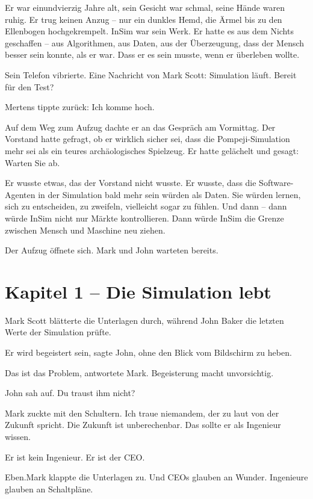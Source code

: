 \documentclass[
]{article}
\begin{document}
Er war einundvierzig Jahre alt, sein Gesicht war schmal, seine Hände waren ruhig. Er trug keinen Anzug -- nur ein dunkles Hemd, die Ärmel bis zu den Ellenbogen hochgekrempelt. InSim war sein Werk. Er hatte es aus dem Nichts geschaffen -- aus Algorithmen, aus Daten, aus der Überzeugung, dass der Mensch besser sein konnte, als er war. Dass er es sein musste, wenn er überleben wollte.

Sein Telefon vibrierte. Eine Nachricht von Mark Scott: \glqq Simulation läuft. Bereit für den Test?\grqq

Mertens tippte zurück: \glqq Ich komme hoch.\grqq

Auf dem Weg zum Aufzug dachte er an das Gespräch am Vormittag. Der Vorstand hatte gefragt, ob er wirklich sicher sei, dass die Pompeji-Simulation mehr sei als ein teures archäologisches Spielzeug. Er hatte gelächelt und gesagt: \glqq Warten Sie ab.\grqq

Er wusste etwas, das der Vorstand nicht wusste. Er wusste, dass die Software-Agenten in der Simulation bald mehr sein würden als Daten. Sie würden lernen, sich zu entscheiden, zu zweifeln, vielleicht sogar zu fühlen. Und dann -- dann würde InSim nicht nur Märkte kontrollieren. Dann würde InSim die Grenze zwischen Mensch und Maschine neu ziehen.

Der Aufzug öffnete sich. Mark und John warteten bereits.

\newpage

\section{Kapitel 1 -- Die Simulation lebt}

Mark Scott blätterte die Unterlagen durch, während John Baker die letzten Werte der Simulation prüfte.

\glqq Er wird begeistert sein\grqq, sagte John, ohne den Blick vom Bildschirm zu heben.

\glqq Das ist das Problem\grqq, antwortete Mark. \glqq Begeisterung macht unvorsichtig.\grqq

John sah auf. \glqq Du traust ihm nicht?\grqq

Mark zuckte mit den Schultern. \glqq Ich traue niemandem, der zu laut von der Zukunft spricht. Die Zukunft ist unberechenbar. Das sollte er als Ingenieur wissen.\grqq

\glqq Er ist kein Ingenieur. Er ist der CEO.\grqq

\glqq Eben.\grqq Mark klappte die Unterlagen zu. \glqq Und CEOs glauben an Wunder. Ingenieure glauben an Schaltpläne.\grqq
\end{document}
